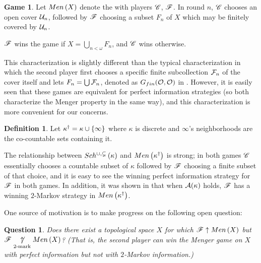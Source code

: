 \documentclass{rmmcart}
\theoremstyle{plain}
\newtheorem{question}[theorem]{Question}
\theoremstyle{definition}
\newtheorem{definition}[theorem]{Definition}
\newtheorem{game}[theorem]{Game}
\theoremstyle{remark}
\theoremstyle{plain}
\theoremstyle{definition}
\theoremstyle{remark}
\begin{document}
  \begin{game}
    Let \(Men\left({X}\right)\) denote the  with players \(\mathscr{C}\),
    \(\mathscr{F}\).
    In round \(n\), \(\mathscr{C}\) chooses an open cover \(\mathcal{U}_n\), followed by
    \(\mathscr{F}\) choosing a
    subset \(F_n\) of \(X\) which may be finitely covered by \(\mathcal{U}_n\).

    \(\mathscr{F}\) wins the game if \(X = \bigcup_{n<\omega}F_n\),
    and \(\mathscr{C}\) wins otherwise.
  \end{game}

  This characterization is slightly different than the typical characterization
  in which the second player first chooses a specific
  finite subcollection \(\mathcal{F}_n\) of the cover itself and lets
  \(F_n=\bigcup \mathcal{F}_n\), denoted as \(G_{fin}(\mathcal{O},\mathcal{O})\)
  in \cite{MR1378387}.
  However, it is easily seen that these games are equivalent
  for perfect information strategies (so both characterize
  the Menger property in the same way), and this characterization is
  more convenient for our concerns.

  \begin{definition}
    Let \(\kappa^\dagger=\kappa\cup\{\infty\}\) where \(\kappa\) is
    discrete and \(\infty\)'s neighborhoods are the co-countable sets
    containing it.
  \end{definition}

  The relationship between \(Sch^{\cup,\subsetneq}\left({\kappa}\right)\) and
  \(Men\left({\kappa^\dagger}\right)\) is strong; in both games \(\mathscr{C}\) essentially
  chooses a countable subset of \(\kappa\) followed by \(\mathscr{F}\) choosing
  a finite subset of that choice, and it is easy to see the winning perfect
  information strategy for \(\mathscr{F}\) in both games.
  In addition, it was shown in
  \cite{clontzMengerGamePreprint} that when \(\mathcal{A}(\kappa)\) holds,
  \(\mathscr{F}\) has a winning \(2\)-Markov strategy in
  \(Men\left({\kappa^\dagger}\right)\).

  One source of motivation is to make progress on the following open question:

  \begin{question}\label{mainQuestion}
    Does there exist a topological space \(X\) for which
    \(\mathscr{F}\uparrow Men\left({X}\right)\) but \(\mathscr{F}\underset{2\text{-mark}}{\not\uparrow}Men\left({X}\right)\)?
    (That is, the second player can win the Menger game on \(X\)
    with perfect information but not with \(2\)-Markov information.)
  \end{question}
\end{document}
